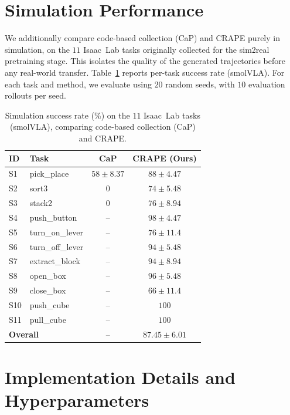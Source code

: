 \documentclass{article}
\begin{document}
\section{Simulation Performance}
\label{app:simperf}

We additionally compare code-based collection (CaP) and CRAPE purely in
simulation, on the $11$ Isaac~Lab tasks originally collected for the sim2real
pretraining stage. This isolates the quality of the generated trajectories before
any real-world transfer. Table~\ref{tab:simperf} reports per-task success rate
(smolVLA). For each task and method, we evaluate using $20$ random seeds, with
$10$ evaluation rollouts per seed.

\begin{table}[h]
\centering
\caption{Simulation success rate (\%) on the $11$ Isaac~Lab tasks (smolVLA), comparing code-based collection (CaP) and CRAPE.}
\label{tab:simperf}
\small
\setlength{\tabcolsep}{6pt}
\begin{tabular}{llcc}
\toprule
\textbf{ID} & \textbf{Task} & \textbf{CaP} & \textbf{CRAPE (Ours)} \\
\midrule
S1  & pick\_place & $58 \pm 8.37$ & $88 \pm 4.47$ \\
S2  & sort3 & 0 & $74 \pm 5.48$ \\
S3  & stack2 & 0 & $76 \pm 8.94$ \\
S4  & push\_button & -- & $98 \pm 4.47$ \\
S5  & turn\_on\_lever & -- & $76 \pm 11.4$ \\
S6  & turn\_off\_lever & -- & $94 \pm 5.48$ \\
S7  & extract\_block & -- & $94 \pm 8.94$ \\
S8  & open\_box & -- & $96 \pm 5.48$ \\
S9  & close\_box & -- & $66 \pm 11.4$ \\
S10 & push\_cube & -- & $100$ \\
S11 & pull\_cube & -- & $100$ \\
\midrule
\multicolumn{2}{l}{\textbf{Overall}} & -- & $87.45 \pm 6.01$ \\
\bottomrule
\end{tabular}
\end{table}

\section{Implementation Details and Hyperparameters}
\label{app:hparams}
\end{document}
